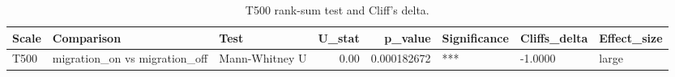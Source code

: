 \begin{table}[htbp]
\centering
\caption{T500 rank-sum test and Cliff's delta.}
\label{tab:t500_wilcoxon_ranksum_cliffs_delta}
\begin{tabular}{lllrrlll}
\toprule
Scale & Comparison & Test & U_stat & p_value & Significance & Cliffs_delta & Effect_size \\
\midrule
T500 & migration_on vs migration_off & Mann-Whitney U & 0.00 & 0.000182672 & *** & -1.0000 & large \\
\bottomrule
\end{tabular}
\end{table}
